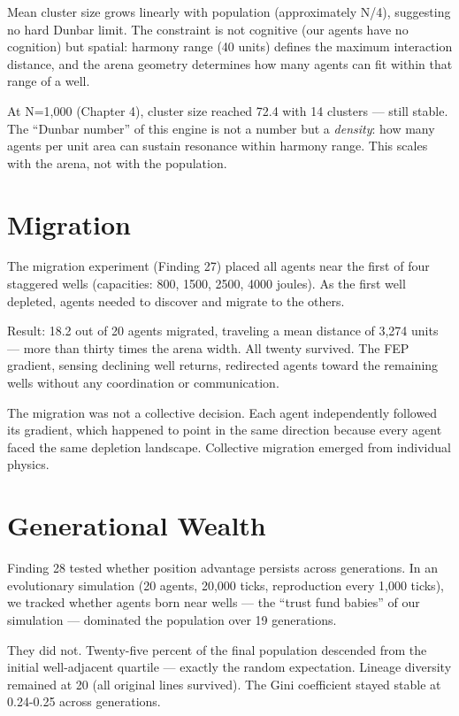 Mean cluster size grows linearly with population (approximately N/4), suggesting no hard Dunbar limit. The constraint is not cognitive (our agents have no cognition) but spatial: harmony range (40 units) defines the maximum interaction distance, and the arena geometry determines how many agents can fit within that range of a well.

At N=1,000 (Chapter 4), cluster size reached 72.4 with 14 clusters --- still stable. The ``Dunbar number'' of this engine is not a number but a \emph{density}: how many agents per unit area can sustain resonance within harmony range. This scales with the arena, not with the population.

\section{Migration}\label{migration}

The migration experiment (Finding 27) placed all agents near the first of four staggered wells (capacities: 800, 1500, 2500, 4000 joules). As the first well depleted, agents needed to discover and migrate to the others.

Result: 18.2 out of 20 agents migrated, traveling a mean distance of 3,274 units --- more than thirty times the arena width. All twenty survived. The FEP gradient, sensing declining well returns, redirected agents toward the remaining wells without any coordination or communication.

The migration was not a collective decision. Each agent independently followed its gradient, which happened to point in the same direction because every agent faced the same depletion landscape. Collective migration emerged from individual physics.

\section{Generational Wealth}\label{generational-wealth}

Finding 28 tested whether position advantage persists across generations. In an evolutionary simulation (20 agents, 20,000 ticks, reproduction every 1,000 ticks), we tracked whether agents born near wells --- the ``trust fund babies'' of our simulation --- dominated the population over 19 generations.

They did not. Twenty-five percent of the final population descended from the initial well-adjacent quartile --- exactly the random expectation. Lineage diversity remained at 20 (all original lines survived). The Gini coefficient stayed stable at 0.24-0.25 across generations.

